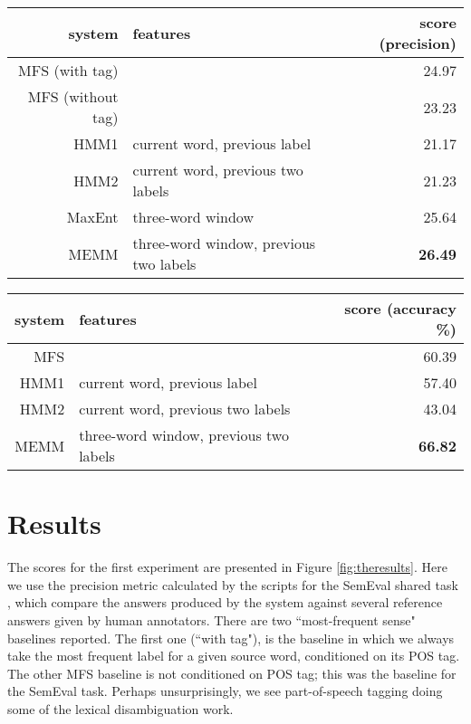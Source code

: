 \documentclass[11pt]{article}
\begin{document}
\begin{figure*}[t!]
  \begin{center}
  \begin{tabular}{|r|l|r|}
    \hline
    system & features & score (precision) \\
    \hline
     MFS (with tag) &                                 & 24.97 \\
     MFS (without tag) &                              & 23.23 \\
    \hline
     HMM1    & current word, previous label           & 21.17 \\
     HMM2    & current word, previous two labels      & 21.23 \\
     MaxEnt  & three-word window                      & 25.64 \\
     MEMM    & three-word window, previous two labels & \textbf{26.49} \\
    \hline
  \end{tabular}
  \end{center}
\caption{Results for the first experiment; SemEval 2013 CL-WSD task.}
\label{fig:theresults}
\end{figure*}

\begin{figure*}[t!]
  \begin{center}
  \begin{tabular}{|r|l|r|}
    \hline
    system & features & score (accuracy \%) \\
    \hline
    MFS      &                                        & 60.39  \\
    \hline
     HMM1    & current word, previous label           & 57.40  \\
     HMM2    & current word, previous two labels      & 43.04  \\
     MEMM    & three-word window, previous two labels & \textbf{66.82}  \\
    \hline
  \end{tabular}
  \end{center}
\caption{Results for the second experiment; all-words lexical selection on the
Guarani Bible}
\label{fig:theresults2}
\end{figure*}

\section{Results}
The scores for the first experiment are presented in Figure
\ref{fig:theresults}. Here we use the precision metric calculated by the
scripts for the SemEval shared task \cite{task10}, which compare the answers
produced by the system against several reference answers given by human
annotators. There are two ``most-frequent sense" baselines reported.  The first
one (``with tag"), is the baseline in which we always take the most frequent
label for a given source word, conditioned on its POS tag. The other MFS
baseline is not conditioned on POS tag; this was the baseline for the SemEval
task.  Perhaps unsurprisingly, we see part-of-speech tagging doing some of the
lexical disambiguation work.
\end{document}
